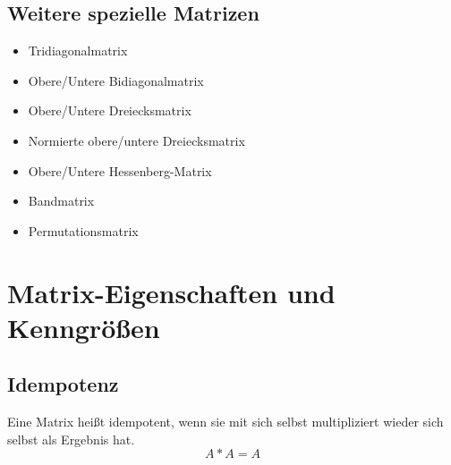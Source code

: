 \documentclass[11pt]{scrreprt}
\begin{document}
\subsection{Weitere spezielle Matrizen}
\begin{itemize}
\item Tridiagonalmatrix
\item Obere/Untere Bidiagonalmatrix
\item Obere/Untere Dreiecksmatrix
\item Normierte obere/untere Dreiecksmatrix
\item Obere/Untere Hessenberg-Matrix
\item Bandmatrix
\item Permutationsmatrix
\end{itemize}
\section{Matrix-Eigenschaften und Kenngrößen}
\subsection{Idempotenz}
Eine Matrix heißt idempotent, wenn sie mit sich selbst multipliziert wieder sich selbst als Ergebnis hat.
\begin{equation}
A * A = A
\end{equation}
\end{document}
